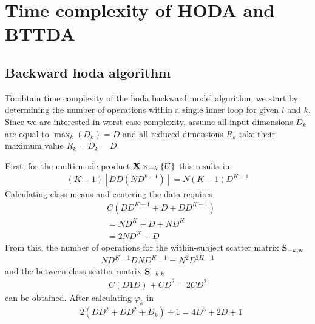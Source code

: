 \section{Time complexity of HODA and BTTDA}

\subsection{Backward \Ac{hoda} algorithm}
To obtain time complexity of the \ac{hoda} backward model algorithm, we start
by determining the number of operations within a single inner loop
for given $i$ and $k$.
Since we are interested in worst-case complexity, assume all input dimensions $D_k$
are equal to $\max_k(D_k) = D$ and all reduced dimensions $R_k$ take their maximum
value $R_k=D_k = D$.

First, for the multi-mode product $\ten{X}\mmprsi{U}{k}$ this results in
\begin{equation}
	\begin{split}
		\left(K-1\right)\left[DD\left(ND^{k-1}\right)\right] = N\left(K-1\right)D^{K+1}
	\end{split}
\end{equation}
Calculating class means and centering the data requires
\begin{equation}
	\begin{split}
		& C\left(DD^{K-1} + D + DD^{K-1}\right) \\
		& = ND^K + D + ND^K \\
		& = 2ND^K + D
	\end{split}
\end{equation}
From this, the number of operations for the within-subject scatter matrix $\mat{S}_{-k, \text{w}}$
\begin{equation}
	\begin{split}
		ND^{K-1}DND^{K-1} = N^2D^{2K-1}
	\end{split}
\end{equation}
and the between-class scatter matrix $\mat{S}_{-k, \text{b}}$
\begin{equation}
	\begin{split}
		C\left(D1D\right) + CD^2 = 2CD^2
	\end{split}
\end{equation}
can be obtained.
After calculating $\varphi_k$ in
\begin{equation}
	\begin{split}
		& 2\left(DD^2+ DD^2+D_k\right) +1
		= 4D^3+2D + 1
	\end{split}
\end{equation}
